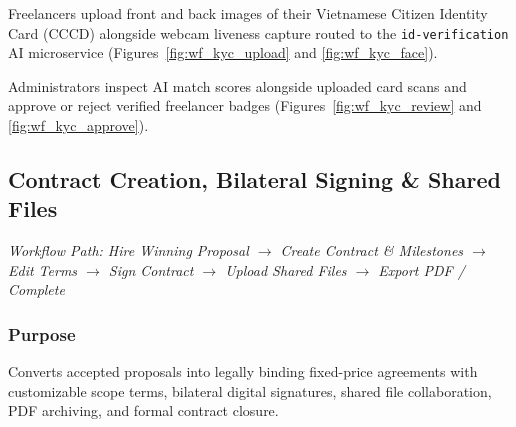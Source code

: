 

Freelancers upload front and back images of their Vietnamese Citizen Identity Card (CCCD) alongside webcam liveness capture routed to the \texttt{id-verification} AI microservice (Figures~\ref{fig:wf_kyc_upload} and \ref{fig:wf_kyc_face}).



Administrators inspect AI match scores alongside uploaded card scans and approve or reject verified freelancer badges (Figures~\ref{fig:wf_kyc_review} and \ref{fig:wf_kyc_approve}).



\subsection{Contract Creation, Bilateral Signing \& Shared Files}
\noindent\textit{Workflow Path: Hire Winning Proposal $\rightarrow$ Create Contract \& Milestones $\rightarrow$ Edit Terms $\rightarrow$ Sign Contract $\rightarrow$ Upload Shared Files $\rightarrow$ Export PDF / Complete}

\subsubsection{Purpose}
Converts accepted proposals into legally binding fixed-price agreements with customizable scope terms, bilateral digital signatures, shared file collaboration, PDF archiving, and formal contract closure.

